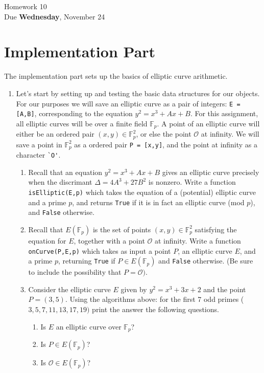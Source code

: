 \documentclass[11pt]{article}
\newcommand{\bF}{\mathbb{F}}
\newcommand{\cO}{\mathcal{O}}
\begin{document}
\begin{center}
\Large {Homework 10}\\
\small {Due \textbf{Wednesday}, November 24}\\
\end{center}
\section*{Implementation Part}
The implementation part sets up the basics of elliptic curve arithmetic.
\begin{enumerate}
\item{Let's start by setting up and testing the basic data structures for our objects.  For our purposes we will save an elliptic curve as a pair of integers: \verb|E = [A,B]|, corresponding to the equation $y^2 = x^3 + Ax + B$.  For this assignment, all elliptic curves will be over a finite field $\bF_p$.  A point of an elliptic curve will either be an ordered pair $(x,y)\in\bF_p^2$, or else the point $\cO$ at infinity.  We will save a point in $\bF_p^2$ as a ordered pair \verb|P = [x,y]|, and the point at infinity as a character \verb|`O'|.
  \begin{enumerate}
    \item{
    Recall that an equation $y^2 = x^3 + Ax + B$ gives an elliptic curve precisely when the discrimant $\Delta = 4A^3 + 27B^2$ is nonzero.  Write a function \verb|isElliptic(E,p)| which takes the equation of a (potential) elliptic curve and a prime $p$, and returns \verb|True| if it is in fact an elliptic curve (mod $p$), and \verb|False| otherwise.
    }
    \item{
    Recall that $E(\bF_p)$ is the set of points $(x,y)\in\bF_p^2$ satisfying the equation for $E$, together with a point $\cO$ at infinity.   Write a function \verb|onCurve(P,E,p)| which takes as input a point $P$, an elliptic curve $E$, and a prime $p$, returning \verb|True| if $P\in E(\bF_p)$ and \verb|False| otherwise.  (Be sure to include the possibility that $P=\cO)$.
    }
    \item{
    Consider the elliptic curve $E$ given by $y^2 = x^3 + 3x + 2$ and the point $P=(3,5)$.  Using the algorithms above: for the first 7 odd primes ($3,5,7,11,13,17,19)$ print the answer the following questions.
    \begin{enumerate}
      \item{Is $E$ an elliptic curve over $\bF_p$?}
      \item{Is $P\in E(\bF_p)$?}
      \item{Is $\cO\in E(\bF_p)$?}

\end{enumerate}}
\end{enumerate}}
\end{enumerate}
\end{document}

